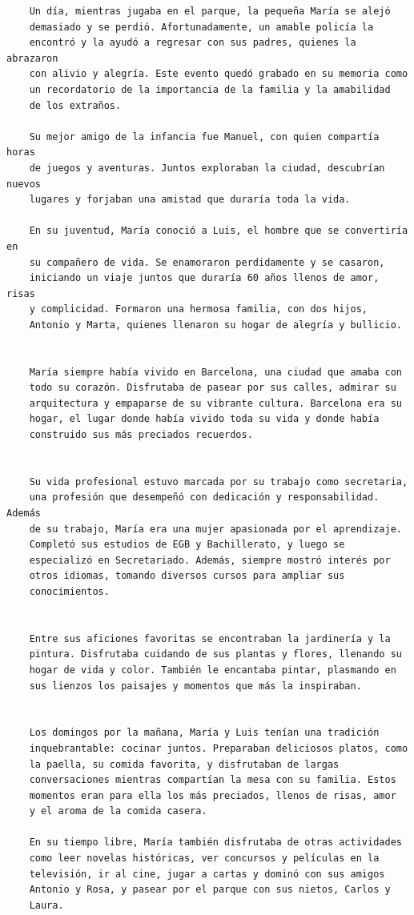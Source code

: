 \begin{verbatim}
	Un día, mientras jugaba en el parque, la pequeña María se alejó
	demasiado y se perdió. Afortunadamente, un amable policía la
	encontró y la ayudó a regresar con sus padres, quienes la abrazaron
	con alivio y alegría. Este evento quedó grabado en su memoria como
	un recordatorio de la importancia de la familia y la amabilidad
	de los extraños.
	
	Su mejor amigo de la infancia fue Manuel, con quien compartía horas
	de juegos y aventuras. Juntos exploraban la ciudad, descubrían nuevos
	lugares y forjaban una amistad que duraría toda la vida.
	
	En su juventud, María conoció a Luis, el hombre que se convertiría en
	su compañero de vida. Se enamoraron perdidamente y se casaron,
	iniciando un viaje juntos que duraría 60 años llenos de amor, risas
	y complicidad. Formaron una hermosa familia, con dos hijos,
	Antonio y Marta, quienes llenaron su hogar de alegría y bullicio.
	
	
	María siempre había vivido en Barcelona, una ciudad que amaba con
	todo su corazón. Disfrutaba de pasear por sus calles, admirar su
	arquitectura y empaparse de su vibrante cultura. Barcelona era su
	hogar, el lugar donde había vivido toda su vida y donde había
	construido sus más preciados recuerdos.
	
	
	Su vida profesional estuvo marcada por su trabajo como secretaria,
	una profesión que desempeñó con dedicación y responsabilidad. Además
	de su trabajo, María era una mujer apasionada por el aprendizaje.
	Completó sus estudios de EGB y Bachillerato, y luego se
	especializó en Secretariado. Además, siempre mostró interés por
	otros idiomas, tomando diversos cursos para ampliar sus
	conocimientos.
	
	
	Entre sus aficiones favoritas se encontraban la jardinería y la
	pintura. Disfrutaba cuidando de sus plantas y flores, llenando su
	hogar de vida y color. También le encantaba pintar, plasmando en
	sus lienzos los paisajes y momentos que más la inspiraban.
	
	
	Los domingos por la mañana, María y Luis tenían una tradición
	inquebrantable: cocinar juntos. Preparaban deliciosos platos, como
	la paella, su comida favorita, y disfrutaban de largas
	conversaciones mientras compartían la mesa con su familia. Estos
	momentos eran para ella los más preciados, llenos de risas, amor
	y el aroma de la comida casera.
	
	En su tiempo libre, María también disfrutaba de otras actividades
	como leer novelas históricas, ver concursos y películas en la
	televisión, ir al cine, jugar a cartas y dominó con sus amigos
	Antonio y Rosa, y pasear por el parque con sus nietos, Carlos y
	Laura. 
	

\end{verbatim}
